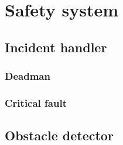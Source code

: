 \section{Safety system} %
\label{sec:mr_safety_system}

	\subsection{Incident handler} %
	\label{sub:mr_incident_handler}
	
		\subsubsection{Deadman} %
		\label{ssub:mr_deadman}
		

		\subsubsection{Critical fault} %
		\label{ssub:mr_critical_fault}
		


	\subsection{Obstacle detector} %
	\label{sub:mr_obstacle_detector}
	

